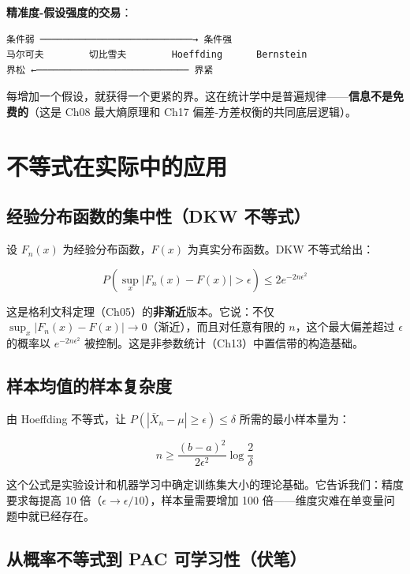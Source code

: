\documentclass[
]{book}
\begin{document}
\textbf{精准度-假设强度的交易}：

\begin{verbatim}
条件弱 ───────────────────────────→ 条件强
马尔可夫        切比雪夫        Hoeffding      Bernstein
界松 ←─────────────────────────── 界紧
\end{verbatim}

每增加一个假设，就获得一个更紧的界。这在统计学中是普遍规律------\textbf{信息不是免费的}（这是 Ch08 最大熵原理和 Ch17 偏差-方差权衡的共同底层逻辑）。

\section{不等式在实际中的应用}\label{ux4e0dux7b49ux5f0fux5728ux5b9eux9645ux4e2dux7684ux5e94ux7528}

\subsection{经验分布函数的集中性（DKW 不等式）}\label{ux7ecfux9a8cux5206ux5e03ux51fdux6570ux7684ux96c6ux4e2dux6027dkw-ux4e0dux7b49ux5f0f}

设 \(F_n(x)\) 为经验分布函数，\(F(x)\) 为真实分布函数。DKW 不等式给出：

\[P\left(\sup_x |F_n(x) - F(x)| > \epsilon\right) \leq 2e^{-2n\epsilon^2}\]

这是格利文科定理（Ch05）的\textbf{非渐近}版本。它说：不仅 \(\sup_x |F_n(x) - F(x)| \to 0\)（渐近），而且对任意有限的 \(n\)，这个最大偏差超过 \(\epsilon\) 的概率以 \(e^{-2n\epsilon^2}\) 被控制。这是非参数统计（Ch13）中置信带的构造基础。

\subsection{样本均值的样本复杂度}\label{ux6837ux672cux5747ux503cux7684ux6837ux672cux590dux6742ux5ea6}

由 Hoeffding 不等式，让 \(P(|\bar{X}_n - \mu| \geq \epsilon) \leq \delta\) 所需的最小样本量为：

\[n \geq \frac{(b-a)^2}{2\epsilon^2} \log\frac{2}{\delta}\]

这个公式是实验设计和机器学习中确定训练集大小的理论基础。它告诉我们：精度要求每提高 10 倍（\(\epsilon \to \epsilon/10\)），样本量需要增加 100 倍------维度灾难在单变量问题中就已经存在。

\subsection{从概率不等式到 PAC 可学习性（伏笔）}\label{ux4eceux6982ux7387ux4e0dux7b49ux5f0fux5230-pac-ux53efux5b66ux4e60ux6027ux4f0fux7b14}
\end{document}
